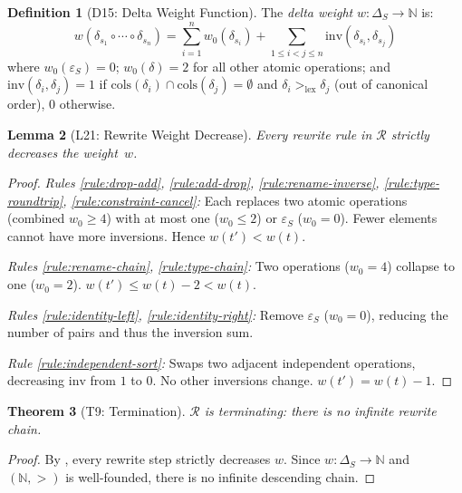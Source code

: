 \documentclass[11pt,a4paper]{article}
\newtheorem{theorem}{Theorem}[section]
\newtheorem{lemma}[theorem]{Lemma}
\theoremstyle{definition}
\newtheorem{definition}[theorem]{Definition}
\newcommand{\DeltaS}{\Delta_{\!S}}
\newcommand{\epsS}{\varepsilon_S}
\begin{document}
\begin{definition}[D15: Delta Weight Function]\label{def:delta-weight}
The \emph{delta weight} $w\colon \DeltaS \to \mathbb{N}$ is:
\[
w(\delta_{s_1} \circ \cdots \circ \delta_{s_n})
  = \sum_{i=1}^{n} w_0(\delta_{s_i})
  + \sum_{1 \le i < j \le n} \mathrm{inv}(\delta_{s_i}, \delta_{s_j})
\]
where $w_0(\epsS) = 0$; $w_0(\delta) = 2$ for all other atomic operations; and
$\mathrm{inv}(\delta_i, \delta_j) = 1$ if $\mathrm{cols}(\delta_i) \cap
\mathrm{cols}(\delta_j) = \emptyset$ and $\delta_i >_{\mathrm{lex}} \delta_j$
(out of canonical order), $0$ otherwise.
\end{definition}

\begin{lemma}[L21: Rewrite Weight Decrease]\label{lem:weight-decrease}
Every rewrite rule in $\mathcal{R}$ strictly decreases the weight~$w$.
\end{lemma}

\begin{proof}
\emph{Rules \ref{rule:drop-add}, \ref{rule:add-drop}, \ref{rule:rename-inverse},
\ref{rule:type-roundtrip}, \ref{rule:constraint-cancel}:}
Each replaces two atomic operations (combined $w_0 \ge 4$) with at most one
($w_0 \le 2$) or $\epsS$ ($w_0 = 0$).  Fewer elements cannot have more
inversions.  Hence $w(t') < w(t)$.

\emph{Rules \ref{rule:rename-chain}, \ref{rule:type-chain}:}
Two operations ($w_0 = 4$) collapse to one ($w_0 = 2$).
$w(t') \le w(t) - 2 < w(t)$.

\emph{Rules \ref{rule:identity-left}, \ref{rule:identity-right}:}
Remove $\epsS$ ($w_0 = 0$), reducing the number of pairs and thus the inversion
sum.

\emph{Rule \ref{rule:independent-sort}:}
Swaps two adjacent independent operations, decreasing $\mathrm{inv}$ from $1$
to $0$.  No other inversions change.  $w(t') = w(t) - 1$.
\end{proof}

\begin{theorem}[T9: Termination]\label{thm:termination}
$\mathcal{R}$ is terminating: there is no infinite rewrite chain.
\end{theorem}

\begin{proof}
By , every rewrite step strictly decreases $w$.
Since $w\colon \DeltaS \to \mathbb{N}$ and $(\mathbb{N}, >)$ is well-founded,
there is no infinite descending chain.
\end{proof}
\end{document}

